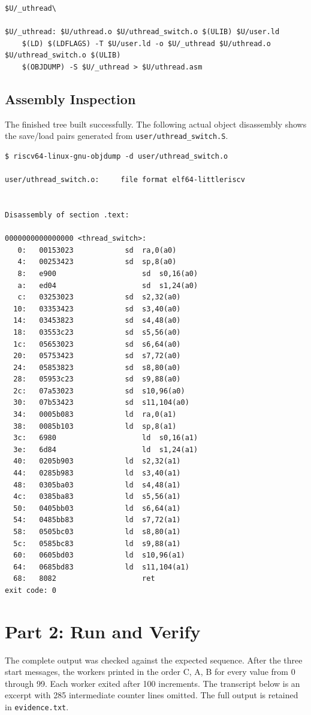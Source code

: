 \documentclass[12pt,a4paper]{article}
\begin{document}
\begin{lstlisting}[caption={New UPROGS entry and explicit link rule}]
	$U/_uthread\

$U/_uthread: $U/uthread.o $U/uthread_switch.o $(ULIB) $U/user.ld
	$(LD) $(LDFLAGS) -T $U/user.ld -o $U/_uthread $U/uthread.o $U/uthread_switch.o $(ULIB)
	$(OBJDUMP) -S $U/_uthread > $U/uthread.asm
\end{lstlisting}

\subsection{Assembly Inspection}
The finished tree built successfully. The following actual object disassembly
shows the save/load pairs generated from \texttt{user/uthread\_switch.S}.

\begin{lstlisting}[caption={Disassembly of the context-switch routine}]
$ riscv64-linux-gnu-objdump -d user/uthread_switch.o

user/uthread_switch.o:     file format elf64-littleriscv


Disassembly of section .text:

0000000000000000 <thread_switch>:
   0:	00153023          	sd	ra,0(a0)
   4:	00253423          	sd	sp,8(a0)
   8:	e900                	sd	s0,16(a0)
   a:	ed04                	sd	s1,24(a0)
   c:	03253023          	sd	s2,32(a0)
  10:	03353423          	sd	s3,40(a0)
  14:	03453823          	sd	s4,48(a0)
  18:	03553c23          	sd	s5,56(a0)
  1c:	05653023          	sd	s6,64(a0)
  20:	05753423          	sd	s7,72(a0)
  24:	05853823          	sd	s8,80(a0)
  28:	05953c23          	sd	s9,88(a0)
  2c:	07a53023          	sd	s10,96(a0)
  30:	07b53423          	sd	s11,104(a0)
  34:	0005b083          	ld	ra,0(a1)
  38:	0085b103          	ld	sp,8(a1)
  3c:	6980                	ld	s0,16(a1)
  3e:	6d84                	ld	s1,24(a1)
  40:	0205b903          	ld	s2,32(a1)
  44:	0285b983          	ld	s3,40(a1)
  48:	0305ba03          	ld	s4,48(a1)
  4c:	0385ba83          	ld	s5,56(a1)
  50:	0405bb03          	ld	s6,64(a1)
  54:	0485bb83          	ld	s7,72(a1)
  58:	0505bc03          	ld	s8,80(a1)
  5c:	0585bc83          	ld	s9,88(a1)
  60:	0605bd03          	ld	s10,96(a1)
  64:	0685bd83          	ld	s11,104(a1)
  68:	8082                	ret
exit code: 0
\end{lstlisting}

\section{Part 2: Run and Verify}
The complete output was checked against the expected sequence. After the three
start messages, the workers printed in the order C, A, B for every value from 0
through 99. Each worker exited after 100 increments. The transcript below is an
excerpt with 285 intermediate counter lines omitted. The full output is retained
in \texttt{evidence.txt}.
\end{document}
